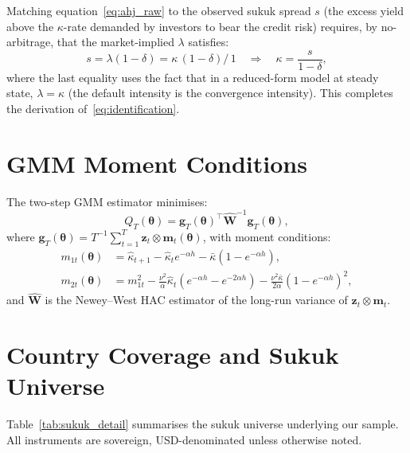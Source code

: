 \documentclass[12pt]{article}
\theoremstyle{plain}
\theoremstyle{definition}
\theoremstyle{remark}
\begin{document}
Matching equation~\eqref{eq:ahj_raw} to the observed sukuk spread $s$ (the
excess yield above the $\kappa$-rate demanded by investors to bear the credit
risk) requires, by no-arbitrage, that the market-implied $\lambda$ satisfies:
\begin{equation}
  s = \lambda(1 - \delta) = \kappa\,(1-\delta)\bigl/\,1 \quad
    \Longrightarrow \quad \kappa = \frac{s}{1-\delta},
\end{equation}
where the last equality uses the fact that in a reduced-form model at steady
state, $\lambda = \kappa$ (the default intensity is the convergence intensity).
This completes the derivation of~\eqref{eq:identification}.

\section{GMM Moment Conditions}
\label{app:gmm}

The two-step GMM estimator minimises:
\begin{equation}
  Q_T(\boldsymbol{\theta}) =
    \mathbf{g}_T(\boldsymbol{\theta})^\top
    \hat{\mathbf{W}}^{-1}
    \mathbf{g}_T(\boldsymbol{\theta}),
\end{equation}
where $\mathbf{g}_T(\boldsymbol{\theta}) = T^{-1} \sum_{t=1}^{T}
\mathbf{z}_t \otimes \mathbf{m}_t(\boldsymbol{\theta})$, with moment
conditions:
\begin{align}
  m_{1t}(\boldsymbol{\theta}) &=
    \hat{\kappa}_{t+1} - \hat{\kappa}_t e^{-\alpha h}
    - \bar{\kappa}(1 - e^{-\alpha h}), \\
  m_{2t}(\boldsymbol{\theta}) &=
    m_{1t}^2 - \frac{\nu^2}{\alpha}\hat{\kappa}_t
    (e^{-\alpha h} - e^{-2\alpha h})
    - \frac{\nu^2 \bar{\kappa}}{2\alpha}(1 - e^{-\alpha h})^2,
\end{align}
and $\hat{\mathbf{W}}$ is the Newey--West HAC estimator of the long-run
variance of $\mathbf{z}_t \otimes \mathbf{m}_t$.

\section{Country Coverage and Sukuk Universe}
\label{app:data}

Table~\ref{tab:sukuk_detail} summarises the sukuk universe underlying our
sample. All instruments are sovereign, USD-denominated unless otherwise noted.
\end{document}
